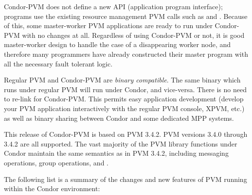 Condor-PVM does not define a new API (application program interface);
programs use the existing resource management PVM calls such
as  and .  Because of this, some
master-worker PVM applications are ready to run under Condor-PVM with no
changes at all.  Regardless of using Condor-PVM or not, it is good
master-worker design to handle the case of a disappearing worker node,
and therefore many programmers have already constructed their master program
with all the necessary fault tolerant logic.

Regular PVM and Condor-PVM are \emph{binary compatible}.
The same binary which runs under regular PVM will run
under Condor, and vice-versa.  There is no need to re-link for Condor-PVM.
This permits easy application development
(develop your PVM application interactively with the regular PVM console, XPVM,
etc.) as well as binary sharing between Condor and some dedicated MPP systems.

This release of Condor-PVM is based on PVM 3.4.2.  PVM versions 
3.4.0 through 3.4.2 are all supported.  The vast majority of the PVM
library functions under Condor maintain the same semantics as in
PVM 3.4.2, including messaging operations, group operations, and 
.

The following list
is a summary of the changes and new features of PVM running within the
Condor environment:

